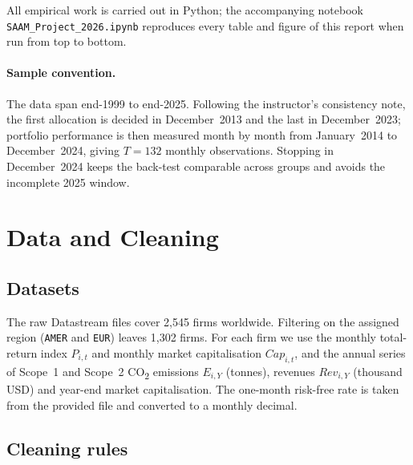 \documentclass[11pt,a4paper]{article}
\newcommand{\co}{CO\textsubscript{2}}
\begin{document}
All empirical work is carried out in Python; the accompanying notebook
\texttt{SAAM\_Project\_2026.ipynb} reproduces every table and figure of this
report when run from top to bottom.

\paragraph{Sample convention.} The data span end-1999 to end-2025. Following the
instructor's consistency note, the first allocation is decided in
December~2013 and the last in December~2023; portfolio performance is then
measured month by month from January~2014 to December~2024, giving
$T=132$ monthly observations. Stopping in December~2024 keeps the
back-test comparable across groups and avoids the incomplete 2025 window.

\section{Data and Cleaning}

\subsection{Datasets}

The raw Datastream files cover 2{,}545 firms worldwide. Filtering on the
assigned region (\texttt{AMER} and \texttt{EUR}) leaves 1{,}302 firms. For each
firm we use the monthly total-return index $P_{i,t}$ and monthly market
capitalisation $Cap_{i,t}$, and the annual series of Scope~1 and Scope~2 \co{}
emissions $E_{i,Y}$ (tonnes), revenues $Rev_{i,Y}$ (thousand USD) and year-end
market capitalisation. The one-month risk-free rate is taken from the provided
file and converted to a monthly decimal.

\subsection{Cleaning rules}
\end{document}

